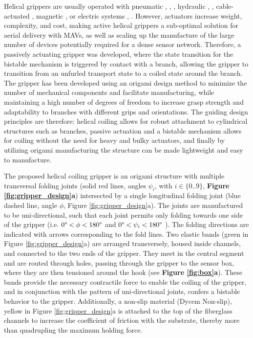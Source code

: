 Helical grippers are usually operated with pneumatic \cite{Kumar2018}, \cite{Hu2020}, \mbox{\cite{Pal2020ElasticMachines}}, hydraulic \cite{Galloway2016}, \cite{Hoang2020a}, cable-actuated \cite{Mazzolai2019}, magnetic \mbox{\cite{Wu2021StretchableTwisting}}, or electric systems \mbox{\cite{Meder2022AArrangement}}, \mbox{\cite{Shao2018BioinspiredActuators}}. However, actuators increase weight, complexity, and cost, making active helical grippers a sub-optimal solution for aerial delivery with MAVs, as well as scaling up the manufacture of the large number of devices potentially required for a dense sensor network. Therefore, a passively actuating gripper was developed, where the state transition for the bistable mechanism is triggered by contact with a branch, allowing the gripper to transition from an unfurled transport state to a coiled state around the branch. The gripper has been developed using an origami design method to minimize the number of mechanical components and facilitate manufacturing, while maintaining a high number of degrees of freedom to increase grasp strength and adaptability to branches with different grips and orientations. The guiding design principles are therefore: helical coiling allows for robust attachment to cylindrical structures such as branches, passive actuation and a bistable mechanism allows for coiling without the need for heavy and bulky actuators, and finally by utilizing origami manufacturing the structure can be made lightweight and easy to manufacture.

The proposed helical coiling gripper is an origami structure with multiple transversal folding joints (solid red lines, angles $\psi_i$, with $i \in \{0..9\}$, \textbf{Figure \ref{fig:gripper_design}a}) intersected by a single longitudinal folding joint (blue dashed line, angle $\phi$, Figure \ref{fig:gripper_design}a). The joints are manufactured to be uni-directional, such that each joint permits only folding towards one side of the gripper (i.e. $0\degree<\phi<180\degree$ and $0\degree<\psi_i<180\degree$ ). The folding directions are indicated with arrows corresponding to the fold lines. Two elastic bands (green in Figure \ref{fig:gripper_design}a) are arranged transversely, housed inside channels, and connected to the two ends of the gripper. They meet in the central segment and are routed through holes, passing through the gripper to the sensor box, where they are then tensioned around the hook (see \textbf{Figure \ref{fig:box}a}). These bands provide the necessary contractile force to enable the coiling of the gripper, and in conjunction with the pattern of uni-directional joints, confers a bistable behavior to the gripper. Additionally, a non-slip material (Dycem Non-slip), yellow in Figure \ref{fig:gripper_design}a is attached to the top of the fiberglass channels to increase the coefficient of friction with the substrate, thereby more than quadrupling the maximum holding force.


